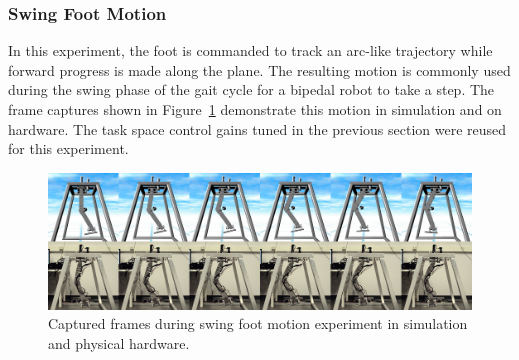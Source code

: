 
\subsubsection{Swing Foot Motion} %
\label{ssub:swing_foot_motion}

In this experiment, the foot is commanded to track an arc-like trajectory while forward progress is made along the plane. The resulting motion is commonly used during the swing phase of the gait cycle for a bipedal robot to take a step. The frame captures shown in Figure~\ref{fig:swingmotionframes} demonstrate this motion in simulation and on hardware. The task space control gains tuned in the previous section were reused for this experiment. 

\begin{figure}[!t]
	\centering
    \includegraphics[scale=0.145]{fig/experiments/swingmotionframes.png} 
  	\caption{Captured frames during swing foot motion experiment in simulation and physical hardware.}
	\label{fig:swingmotionframes}
\end{figure}

